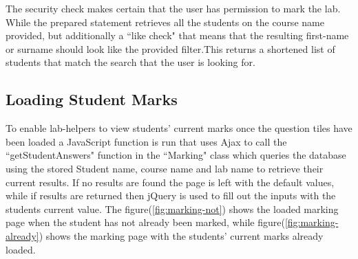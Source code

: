 \documentclass[11pt]{report}
\begin{document}
\noindent The security check makes certain that the user has permission to mark the lab. While the prepared statement retrieves all the students on the course name provided, but additionally a ``like check" that means that the resulting first-name or surname should look like the provided filter.This returns a shortened list of students that match the search that the user is looking for.



\subsection{Loading Student Marks}

To enable lab-helpers to view students' current marks once the question tiles have been loaded a JavaScript function is run that uses Ajax to call the ``getStudentAnswers" function in the ``Marking" class which queries the database using the stored Student name, course name and lab name to retrieve their current results. If no results are found the page is left with the default values, while if results are returned then jQuery is used to fill out the inputs with the students current value. The figure(\ref{fig:marking-not}) shows the loaded marking page when the student has not already been marked, while figure(\ref{fig:marking-already}) shows the marking page with the students' current marks already loaded.
\end{document}
